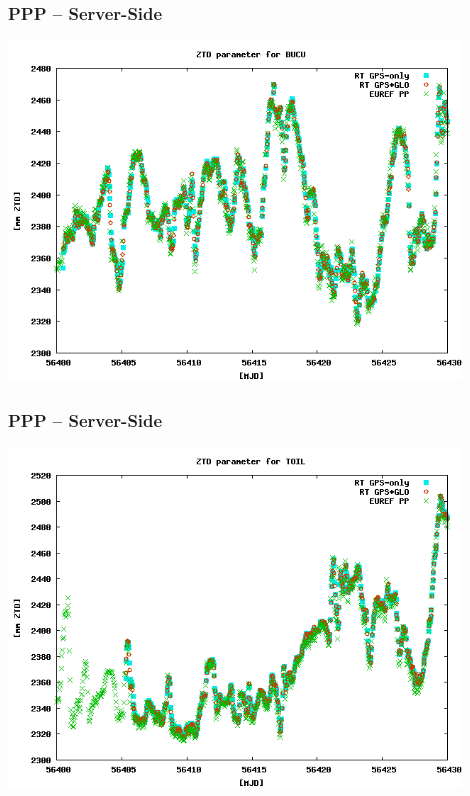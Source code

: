 \documentclass[10pt]{beamer}
\begin{document}

\begin{frame}
\frametitle{PPP -- Server-Side}
  \begin{center}
    \includegraphics[width=0.9\textwidth,angle=0]{tropo1.png}
  \end{center}
\end{frame}


\begin{frame}
\frametitle{PPP -- Server-Side}
  \begin{center}
    \includegraphics[width=0.9\textwidth,angle=0]{tropo2.png}
  \end{center}
\end{frame}
\end{document}
